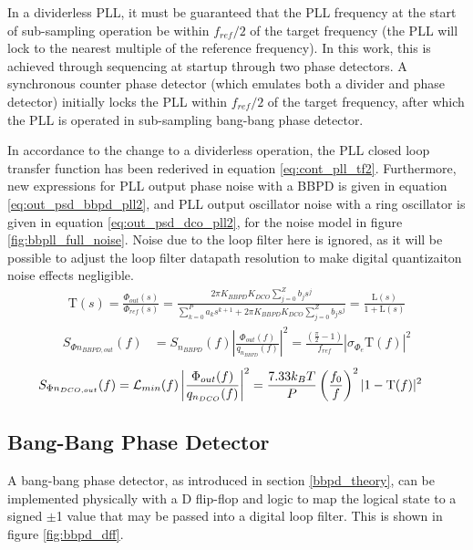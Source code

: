  In a dividerless PLL, it must be guaranteed that the PLL frequency at the start of sub-sampling operation be within $f_{ref}/2$ of the target frequency (the PLL will lock to the nearest multiple of the reference frequency). In this work, this is achieved through sequencing at startup through two phase detectors. A synchronous counter phase detector (which emulates both a divider and phase detector) initially locks the PLL within $f_{ref}/2$ of the target frequency, after which the PLL is operated in sub-sampling bang-bang phase detector.

  In accordance to the change to a dividerless operation, the PLL closed loop transfer function has been rederived in equation \ref{eq:cont_pll_tf2}. Furthermore, new expressions for PLL output phase noise with a BBPD is given in equation \ref{eq:out_psd_bbpd_pll2}, and PLL output oscillator noise with a ring oscillator is given in equation \ref{eq:out_psd_dco_pll2}, for the noise model in figure \ref{fig:bbpll_full_noise}. Noise due to the loop filter here is ignored, as it will be possible to adjust the loop filter datapath resolution to make digital quantizaiton noise effects negligible.
		\begin{align} \label{eq:cont_pll_tf2}
			\mathrm{T}(s) = \frac{\Phi_{out}(s)}{\Phi_{ref}(s)} = \frac{2\pi K_{BBPD}K_{DCO}\sum_{j=0}^Z b_js^j}{\sum_{k=0}^P a_ks^{k+1} + 2\pi K_{BBPD}K_{DCO}\sum_{j=0}^Z b_js^j} = \frac{\mathrm{L}(s)}{1 + \mathrm{L}(s)}
		\end{align}
		\begin{align}\label{eq:out_psd_bbpd_pll2}
			S_{\Phi n_{BBPD,out}}(f) &= S_{n_{BBPD}}(f)\left|\frac{\Phi_{out}(f)}{q_{n_{BBPD}}(f)}\right|^2 = \frac{\left(\frac{\pi}{2}-1\right)}{f_{ref}}\left|\sigma_{\Phi_e}\mathrm{T}(f)\right|^2
		\end{align}
		\begin{align}\label{eq:out_psd_dco_pll2}
			S_{\Phi n_{DCO,out}}(f) &= \mathcal{L}_{min}(f)\left|\frac{\Phi_{out}(f)}{q_{n_{DCO}}(f)}\right|^2 = \frac{7.33k_BT}{P}\left(\frac{f_0}{f}\right)^2|1-\textnormal{T}(f)|^2 
		\end{align}


	\subsection{Bang-Bang Phase Detector}
		A bang-bang phase detector, as introduced in section \ref{bbpd_theory}, can be implemented physically with a D flip-flop \cite{Razavi2020} and logic to map the logical state to a signed $\pm$1 value that may be passed into a digital loop filter. This is shown in figure \ref{fig:bbpd_dff}. 

